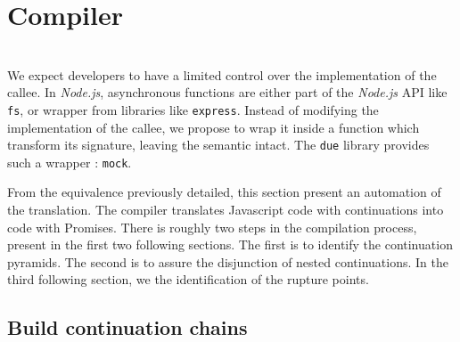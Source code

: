 \section{Compiler} \label{section:compiler}

\\
We expect developers to have a limited control over the implementation of the callee.
In \textit{Node.js}, asynchronous functions are either part of the \textit{Node.js} API like \texttt{fs}, or wrapper from libraries like \texttt{express}.
Instead of modifying the implementation of the callee, we propose to wrap it inside a function which transform its signature, leaving the semantic intact.
The \texttt{due} library provides such a wrapper : \texttt{mock}.


From the equivalence previously detailed, this section present an automation of the translation.
The compiler translates Javascript code with continuations into code with Promises.
There is roughly two steps in the compilation process, present in the first two following sections.
The first is to identify the continuation pyramids.
The second is to assure the disjunction of nested continuations.
In the third following section, we the identification of the rupture points.



\subsection{Build continuation chains} \label{section:compiler:chain}


